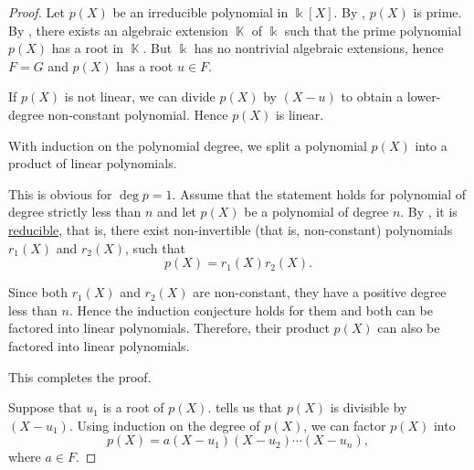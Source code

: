\begin{proof}
   Let \( p(X) \) be an irreducible polynomial in \( \Bbbk[X] \). By , \( p(X) \) is prime. By , there exists an algebraic extension \( \BbbK \) of \( \Bbbk \) such that the prime polynomial \( p(X) \) has a root in \( \BbbK \). But \( \Bbbk \) has no nontrivial algebraic extensions, hence \( F = G \) and \( p(X) \) has a root \( u \in F \).

  If \( p(X) \) is not linear, we can divide \( p(X) \) by \( (X - u) \) to obtain a lower-degree non-constant polynomial. Hence \( p(X) \) is linear.

   With induction on the polynomial degree, we split a polynomial \( p(X) \) into a product of linear polynomials.

  This is obvious for \( \deg p = 1 \). Assume that the statement holds for polynomial of degree strictly less than \( n \) and let \( p(X) \) be a polynomial of degree \( n \). By , it is \hyperref[def:irreducible_ring_element]{reducible}, that is, there exist non-invertible (that is, non-constant) polynomials \( r_1(X) \) and \( r_2(X) \), such that
  \begin{equation*}
    p(X) = r_1(X) r_2(X).
  \end{equation*}

  Since both \( r_1(X) \) and \( r_2(X) \) are non-constant, they have a positive degree less than \( n \). Hence the induction conjecture holds for them and both can be factored into linear polynomials. Therefore, their product \( p(X) \) can also be factored into linear polynomials.

  This completes the proof.

   Suppose that \( u_1 \) is a root of \( p(X) \).  tells us that \( p(X) \) is divisible by \( (X - u_1) \). Using induction on the degree of \( p(X) \), we can factor \( p(X) \) into
  \begin{equation*}
    p(X) = a (X - u_1) (X - u_2) \cdots (X - u_n),
  \end{equation*}
  where \( a \in F \).


\end{proof}
